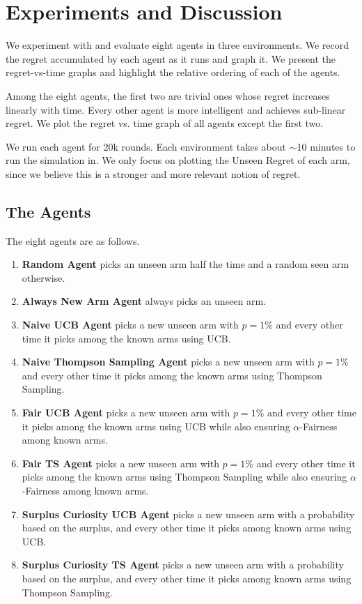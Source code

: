 \section{Experiments and Discussion}

We experiment with and evaluate eight agents in three environments. We record the regret accumulated by each agent as it runs and graph it. We present the regret-vs-time graphs and highlight the relative ordering of each of the agents.

Among the eight agents, the first two are trivial ones whose regret increases linearly with time. Every other agent is more intelligent and achieves sub-linear regret. We plot the regret vs. time graph of all agents except the first two.

We run each agent for 20k rounds. Each environment takes about $\sim$10 minutes to run the simulation in. We only focus on plotting the Unseen Regret of each arm, since we believe this is a stronger and more relevant notion of regret.

\subsection{The Agents}

The eight agents are as follows.

\begin{enumerate}
    \item \textbf{Random Agent} picks an unseen arm half the time and a random seen arm otherwise.
    \item \textbf{Always New Arm Agent} always picks an unseen arm.
    \item \textbf{Naive UCB Agent} picks a new unseen arm with $p=1\%$ and every other time it picks among the known arms using UCB.
    \item \textbf{Naive Thompson Sampling Agent} picks a new unseen arm with $p=1\%$ and every other time it picks among the known arms using Thompson Sampling.
    \item \textbf{Fair UCB Agent} picks a new unseen arm with $p=1\%$ and every other time it picks among the known arms using UCB while also ensuring $\alpha$-Fairness among known arms.
    \item \textbf{Fair TS Agent} picks a new unseen arm with $p=1\%$ and every other time it picks among the known arms using Thompson Sampling while also ensuring $\alpha$-Fairness among known arms.
    \item \textbf{Surplus Curiosity UCB Agent} picks a new unseen arm with a probability based on the surplus, and every other time it picks among known arms using UCB.
    \item \textbf{Surplus Curiosity TS Agent} picks a new unseen arm with a probability based on the surplus, and every other time it picks among known arms using Thompson Sampling.
\end{enumerate}

